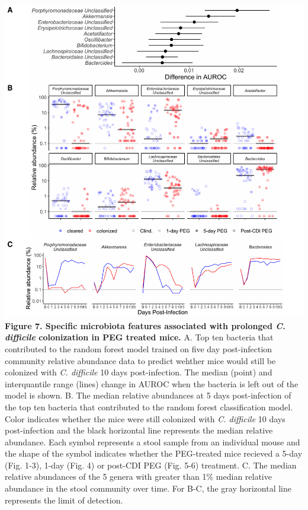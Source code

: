 \documentclass[
  11pt,
]{article}
\begin{document}
\newpage

\includegraphics{figure_7.pdf} \textbf{Figure 7. Specific microbiota
features associated with prolonged \emph{C. difficile} colonization in
PEG treated mice.} A. Top ten bacteria that contributed to the random
forest model trained on five day post-infection community relative
abundance data to predict wehther mice would still be colonized with
\emph{C. difficile} 10 days post-infection. The median (point) and
interquantile range (lines) change in AUROC when the bacteria is left
out of the model is shown. B. The median relative abundances at 5 days
post-infection of the top ten bacteria that contributed to the random
forest classification model. Color indicates whether the mice were still
colonized with \emph{C. difficile} 10 days post-infection and the black
horizontal line represents the median relative abundance. Each symbol
represents a stool sample from an individual mouse and the shape of the
symbol indicates whether the PEG-treated mice recieved a 5-day (Fig.
1-3), 1-day (Fig. 4) or post-CDI PEG (Fig. 5-6) treatment. C. The median
relative abundances of the 5 genera with greater than 1\% median
relative abundance in the stool community over time. For B-C, the gray
horizontal line represents the limit of detection. \newpage
\end{document}

